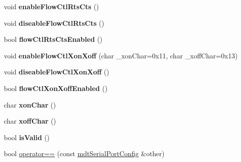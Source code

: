 \begin{DoxyCompactItemize}
\item 
\hypertarget{classmdt_serial_port_config_accac127fab319e881a0461f76a97362c}{
void {\bfseries enableFlowCtlRtsCts} ()}
\label{classmdt_serial_port_config_accac127fab319e881a0461f76a97362c}

\item 
\hypertarget{classmdt_serial_port_config_a5f0af023613beabc6aeb527b280ae5c2}{
void {\bfseries diseableFlowCtlRtsCts} ()}
\label{classmdt_serial_port_config_a5f0af023613beabc6aeb527b280ae5c2}

\item 
\hypertarget{classmdt_serial_port_config_a5933c0d69ed0b710bb578efbca2eb25d}{
bool {\bfseries flowCtlRtsCtsEnabled} ()}
\label{classmdt_serial_port_config_a5933c0d69ed0b710bb578efbca2eb25d}

\item 
\hypertarget{classmdt_serial_port_config_aff4d979dc07061dd7ddaba01a08e39e2}{
void {\bfseries enableFlowCtlXonXoff} (char \_\-xonChar=0x11, char \_\-xoffChar=0x13)}
\label{classmdt_serial_port_config_aff4d979dc07061dd7ddaba01a08e39e2}

\item 
\hypertarget{classmdt_serial_port_config_a1ae8683186b22de6cb1faa23191c1403}{
void {\bfseries diseableFlowCtlXonXoff} ()}
\label{classmdt_serial_port_config_a1ae8683186b22de6cb1faa23191c1403}

\item 
\hypertarget{classmdt_serial_port_config_a19821c3f084fb9de5072b4cf180394eb}{
bool {\bfseries flowCtlXonXoffEnabled} ()}
\label{classmdt_serial_port_config_a19821c3f084fb9de5072b4cf180394eb}

\item 
\hypertarget{classmdt_serial_port_config_a9d7e1e2be4debecb5e4646f094fa0add}{
char {\bfseries xonChar} ()}
\label{classmdt_serial_port_config_a9d7e1e2be4debecb5e4646f094fa0add}

\item 
\hypertarget{classmdt_serial_port_config_a084f31a0ae6c1488403d3f5af0b1faa1}{
char {\bfseries xoffChar} ()}
\label{classmdt_serial_port_config_a084f31a0ae6c1488403d3f5af0b1faa1}

\item 
\hypertarget{classmdt_serial_port_config_aa9a2f9a5a82a8cb3408dafe83451ecfb}{
bool {\bfseries isValid} ()}
\label{classmdt_serial_port_config_aa9a2f9a5a82a8cb3408dafe83451ecfb}

\item 
\hypertarget{classmdt_serial_port_config_a31680194276513004e91cd3bee85a398}{
bool \hyperlink{classmdt_serial_port_config_a31680194276513004e91cd3bee85a398}{operator==} (const \hyperlink{classmdt_serial_port_config}{mdtSerialPortConfig} \&other)}
\label{classmdt_serial_port_config_a31680194276513004e91cd3bee85a398}


\end{DoxyCompactItemize}
